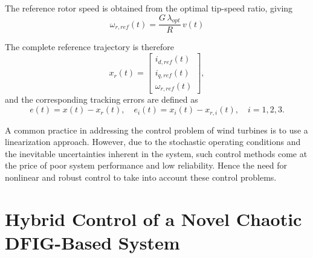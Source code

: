 \documentclass[conference]{IEEEtran}
\begin{document}
The reference rotor speed is obtained from the optimal tip-speed ratio, giving
\begin{equation}
\omega_{r,ref}(t) = \frac{G\,\lambda_{opt}}{R}\, v(t)
\label{eq17}
\end{equation}

The complete reference trajectory is therefore
\begin{equation*}
x_{r}(t) = \begin{bmatrix}
i_{d,ref}(t) \\
i_{q,ref}(t) \\
\omega_{r,ref}(t)
\end{bmatrix},
\end{equation*}
and the corresponding tracking errors are defined as
\begin{equation*}
e(t) = x(t) - x_{r}(t),\quad e_{i}(t) = x_{i}(t) - x_{r,i}(t),\quad i = 1,2,3.
\end{equation*}

A common practice in addressing the control problem of wind turbines is to use a linearization approach. However, due to the stochastic operating conditions and the inevitable uncertainties inherent in the system, such control methods come at the price of poor system performance and low reliability. Hence the need for nonlinear and robust control to take into account these control problems.

\section{Hybrid Control of a Novel Chaotic DFIG-Based System}
\end{document}
